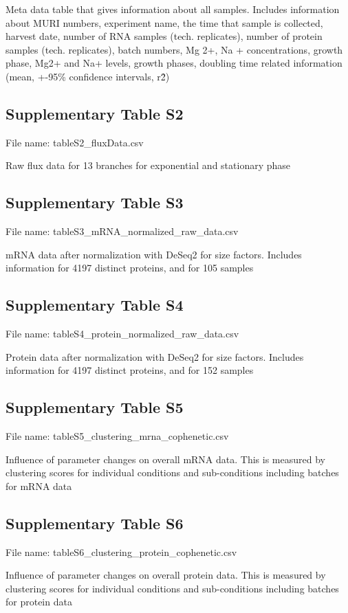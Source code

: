 \documentclass[a4paper]{article}
\begin{document}
Meta data table that gives information about all samples. Includes information about MURI numbers, experiment name, the time that sample is collected, harvest date, number of RNA samples (tech. replicates), number of protein samples (tech. replicates), batch numbers, Mg 2+, Na + concentrations, growth phase, Mg2+ and Na+ levels, growth phases, doubling time related information (mean, +-95\% confidence intervals, r\^2)

\subsection*{Supplementary Table S2}
File name: tableS2\_fluxData.csv

Raw flux data for 13 branches for exponential and stationary phase

\subsection*{Supplementary Table S3}
File name: tableS3\_mRNA\_normalized\_raw\_data.csv

mRNA data after normalization with DeSeq2 for size factors. Includes information for 4197 distinct proteins, and for 105 samples

\subsection*{Supplementary Table S4}
File name: tableS4\_protein\_normalized\_raw\_data.csv

Protein data after normalization with DeSeq2 for size factors. Includes information for 4197 distinct proteins, and for 152 samples

\subsection*{Supplementary Table S5}
File name: tableS5\_clustering\_mrna\_cophenetic.csv

Influence of parameter changes on overall mRNA data. This is measured by clustering scores for individual conditions and sub-conditions including batches for mRNA data

\subsection*{Supplementary Table S6}
File name: tableS6\_clustering\_protein\_cophenetic.csv

Influence of parameter changes on overall protein data. This is measured by clustering scores for individual conditions and sub-conditions including batches for protein data
\end{document}
